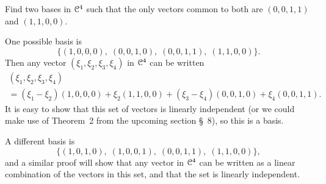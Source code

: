  Find two bases in $\mathcal{C}^4$ such that the only vectors common
to both are $(0,0,1,1)$ and $(1,1,0,0)$.
\begin{solution}
  One possible basis is
  \begin{equation*}
    \{ (1,0,0,0), \; (0,0,1,0), \; (0,0,1,1), \; (1,1,0,0) \}.
  \end{equation*}
  Then any vector $(\xi_1,\xi_2,\xi_3,\xi_4)$ in $\mathcal{C}^4$ can be written
  \begin{multline*}
    (\xi_1,\xi_2,\xi_3,\xi_4) \\
    = (\xi_1 - \xi_2)(1,0,0,0) + \xi_2(1,1,0,0)
    + (\xi_3 - \xi_4)(0,0,1,0) + \xi_4(0,0,1,1).
  \end{multline*}
  It is easy to show that this set of vectors is linearly independent
  (or we could make use of Theorem~2 from the upcoming section \S\ 8),
  so this is a basis.

  A different basis is
  \begin{equation*}
    \{ (1,0,1,0), \; (1,0,0,1), \; (0,0,1,1), \; (1,1,0,0) \},
  \end{equation*}
  and a similar proof will show that any vector in $\mathcal{C}^4$ can be
  written as a linear combination of the vectors in this set, and that
  the set is linearly independent.
\end{solution}

